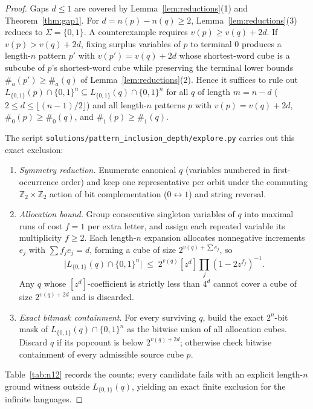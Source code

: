 \documentclass[11pt]{article}
\theoremstyle{plain}
\theoremstyle{definition}
\theoremstyle{remark}
\begin{document}
\begin{proof}
Gaps $d \le 1$ are covered by Lemma~\ref{lem:reductions}(1) and Theorem~\ref{thm:gap1}.
For $d = n(p) - n(q) \ge 2$, Lemma~\ref{lem:reductions}(3) reduces to $\Sigma = \{0,1\}$.
A counterexample requires $v(p) \ge v(q) + 2d$.
If $v(p) > v(q) + 2d$, fixing surplus variables of $p$ to terminal $0$ produces a length-$n$ pattern $p'$ with $v(p') = v(q) + 2d$ whose shortest-word cube is a subcube of $p$'s shortest-word cube while preserving the terminal lower bounds $\#_a(p') \ge \#_a(q)$ of Lemma~\ref{lem:reductions}(2).
Hence it suffices to rule out $L_{\{0,1\}}(p) \cap \{0,1\}^n \subseteq L_{\{0,1\}}(q) \cap \{0,1\}^n$ for all $q$ of length $m = n - d$ ($2 \le d \le \lfloor (n-1)/2 \rfloor$) and all length-$n$ patterns $p$ with $v(p) = v(q) + 2d$, $\#_0(p) \ge \#_0(q)$, and $\#_1(p) \ge \#_1(q)$.

The script \texttt{solutions/pattern\_inclusion\_depth/explore.py} carries out this exact exclusion:
\begin{enumerate}[label=\textup{(\arabic*)},leftmargin=1.8em,itemsep=2pt]
\item \emph{Symmetry reduction.} Enumerate canonical $q$ (variables numbered in first-occurrence order) and keep one representative per orbit under the commuting $\mathbb{Z}_2 \times \mathbb{Z}_2$ action of bit complementation ($0 \leftrightarrow 1$) and string reversal.
\item \emph{Allocation bound.} Group consecutive singleton variables of $q$ into maximal runs of cost $f = 1$ per extra letter, and assign each repeated variable its multiplicity $f \ge 2$. Each length-$n$ expansion allocates nonnegative increments $e_j$ with $\sum f_j e_j = d$, forming a cube of size $2^{v(q)+\sum e_j}$, so
\[
\bigl|L_{\{0,1\}}(q) \cap \{0,1\}^n\bigr| \;\le\; 2^{v(q)} [z^d] \prod_j (1 - 2z^{f_j})^{-1}.
\]
Any $q$ whose $[z^d]$-coefficient is strictly less than $4^d$ cannot cover a cube of size $2^{v(q)+2d}$ and is discarded.
\item \emph{Exact bitmask containment.} For every surviving $q$, build the exact $2^n$-bit mask of $L_{\{0,1\}}(q) \cap \{0,1\}^n$ as the bitwise union of all allocation cubes. Discard $q$ if its popcount is below $2^{v(q)+2d}$; otherwise check bitwise containment of every admissible source cube $p$.
\end{enumerate}
Table~\ref{tab:n12} records the counts; every candidate fails with an explicit length-$n$ ground witness outside $L_{\{0,1\}}(q)$, yielding an exact finite exclusion for the infinite languages.
\end{proof}
\end{document}
